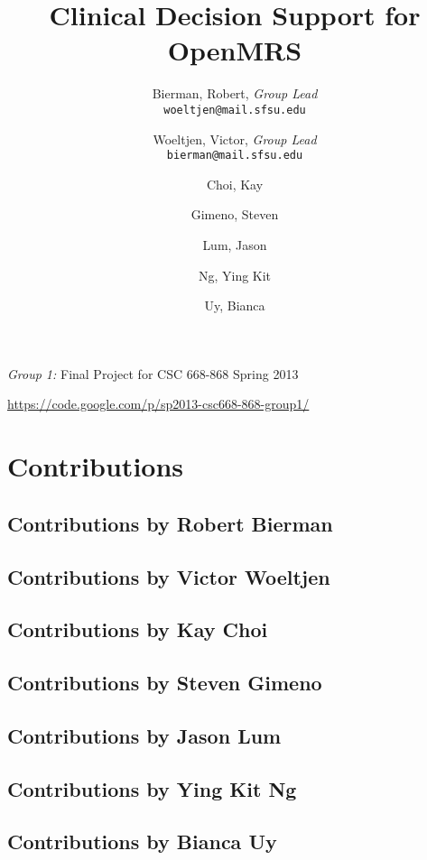 \documentclass[12pt,letterpaper]{article}
\title{
  Clinical Decision Support for OpenMRS
}
\author{
        Bierman, Robert,  \emph{Group Lead}  \\ \texttt{woeltjen@mail.sfsu.edu} \and 
        Woeltjen, Victor, \emph{Group Lead}  \\ \texttt{bierman@mail.sfsu.edu} \and
        Choi, Kay       \and
        Gimeno, Steven  \and
        Lum, Jason      \and
        Ng, Ying Kit    \and
        Uy, Bianca      
}
\begin{document}
\newpage 

\maketitle
\begin{center}
\begin{Large}\emph{Group 1:} Final Project for CSC 668-868 Spring 2013\end{Large} \linebreak
\url{https://code.google.com/p/sp2013-csc668-868-group1/}
\end{center}
\thispagestyle{empty} %

\newpage {}
\tableofcontents


\newpage {}
\section{Contributions} 

\subsection{Contributions by Robert Bierman}

\subsection{Contributions by Victor Woeltjen}

\subsection{Contributions by Kay Choi}

\subsection{Contributions by Steven Gimeno}

\subsection{Contributions by Jason Lum}

\subsection{Contributions by Ying Kit Ng}

\subsection{Contributions by Bianca Uy}
\end{document}
